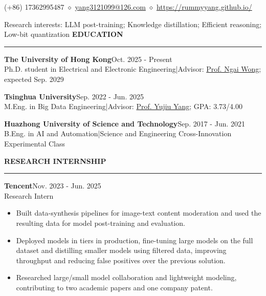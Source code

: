 \documentclass[11pt,a4paper]{article}
\newenvironment{rSection}[1]{
  \Needspace{7\baselineskip}\medskip
  \textbf{#1}\smallskip\hrule\smallskip
}{\par}
\begin{document}
\begingroup{}\par\medskip\endgroup

\begingroup\centering (+86) 17362995487 $\diamond$ \href{mailto:yang3121099@126.com}{yang3121099@126.com} $\diamond$ \href{https://rummyyang.github.io/}{https://rummyyang.github.io/}\par\endgroup\smallskip
Research interests: LLM post-training; Knowledge distillation; Efficient reasoning; Low-bit quantization
\begin{rSection}{EDUCATION}
\textbf{The University of Hong Kong}\hfill Oct. 2025 - Present\\
Ph.D. student in Electrical and Electronic Engineering\quad |\quad Advisor: \href{https://scholar.google.com/citations?user=PM_uMYIAAAAJ&hl=en}{Prof. Ngai Wong}; expected Sep. 2029

\textbf{Tsinghua University}\hfill Sep. 2022 - Jun. 2025\\
M.Eng. in Big Data Engineering\quad |\quad Advisor: \href{https://scholar.google.com/citations?user=4gH3sxsAAAAJ&hl=en}{Prof. Yujiu Yang}; GPA: 3.73/4.00

\textbf{Huazhong University of Science and Technology}\hfill Sep. 2017 - Jun. 2021\\
B.Eng. in AI and Automation\quad |\quad Science and Engineering Cross-Innovation Experimental Class

\end{rSection}
\begin{rSection}{RESEARCH INTERNSHIP}
\textbf{Tencent}\hfill Nov. 2023 - Jun. 2025\\Research Intern
\begin{itemize}
\item Built data-synthesis pipelines for image-text content moderation and used the resulting data for model post-training and evaluation.
\item Deployed models in tiers in production, fine-tuning large models on the full dataset and distilling smaller models using filtered data, improving throughput and reducing false positives over the previous solution.
\item Researched large/small model collaboration and lightweight modeling, contributing to two academic papers and one company patent.
\end{itemize}
\end{rSection}
\end{document}
